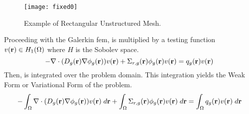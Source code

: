     \begin{figure}
      \centering
      \texttt{[image: fixed0]}
      \caption{Example of Rectangular Unstructured Mesh.}
      \label{fig:fixed0}
    \end{figure}
    
    Proceeding with the Galerkin \gls{fem},  is
    multiplied by a testing function $v(\mathbf{r}) \in H_1(\Omega)$ where $H$ is the
    Sobolev space. 
    \begin{equation}
      \label{eq:testing_function_multiply}
      -\mathbf{\nabla} \cdot (D_g(\mathbf{r}) \mathbf{\nabla} \phi_g(\mathbf{r})) v(\mathbf{r}) + 
        \Sigma_{r,g}(\mathbf{r}) \phi_g(\mathbf{r}) v(\mathbf{r}) =
        q_g(\mathbf{r}) v(\mathbf{r})
    \end{equation}
    Then,  is integrated over the problem 
    domain. This integration yields the Weak Form or Variational Form of the 
    problem.
    \begin{equation}
      \label{eq:fem_weak_form}
      - \int_{\Omega} \mathbf{\nabla} \cdot (D_g(\mathbf{r}) \mathbf{\nabla} \phi_g(\mathbf{r})) v(\mathbf{r}) \; d\mathbf{r}
        + \int_{\Omega} \Sigma_{r,g}(\mathbf{r}) \phi_g(\mathbf{r}) v(\mathbf{r}) \;d\mathbf{r}=
        \int_{\Omega} q_g(\mathbf{r}) v(\mathbf{r}) \;d\mathbf{r}
    \end{equation}
    
